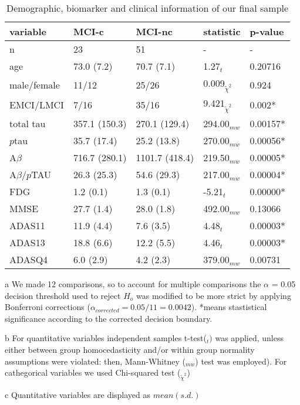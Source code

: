 \documentclass[a4paper,12pt]{elsarticle}
\begin{document}
	
 		\begin{table}[]
 			\centering
 			\begin{threeparttable}
 				\caption{Demographic, biomarker and clinical information of our final sample}
 				\label{my-label}
 				\begin{tabular}{lllll}
 					\toprule
 					variable & MCI-c & MCI-nc & statistic\tnote{b} & p-value \\
 					\midrule
 					n & 23 & 51 & - & -\\
 					age&73.0 (7.2)&70.7 (7.1)&1.27$_{t}$ &0.20716\\
 					male/female& 11/12&25/26&0.009$_{\tilde{\chi}^2}$&0.924\\
 					EMCI/LMCI & 7/16 & 35/16  &  9.421$_{\tilde{\chi}^2}$& 0.002*\\
 					total tau&357.1 (150.3)&270.1 (129.4)&294.00$_{mw}$ &  0.00157*\\
 					$p$tau&35.7 (17.4)&25.2 (13.8)&270.00$_{mw}$ &  0.00056*\\
 					A$\beta$&716.7 (280.1)&1101.7 (418.4)&219.50$_{mw}$ &  0.00005*\\
 					A$\beta/p$TAU&26.3 (25.3)&54.6 (29.3)&217.00$_{mw}$ &  0.00004*\\
 					FDG&1.2 (0.1)&1.3 (0.1)&-5.21$_{t}$&0.00000*\\
 					MMSE&27.7 (1.4)&28.0 (1.8)&492.00$_{mw}$&0.13066\\
 					ADAS11&11.9 (4.4)&7.6 (3.5)&4.48$_{t}$ &0.00003*\\
 					ADAS13&18.8 (6.6)&12.2 (5.5)&4.46$_{t}$ &0.00003*\\
 					ADASQ4& 6.0 (2.9)&4.2 (2.3)&379.00$_{mw}$ &0.00731\\
 					\bottomrule
 				\end{tabular}

	 				\begin{tablenotes}
	 					\item[a]{ We made 12 comparisons, so to account for multiple comparisons the $\alpha$ = 0.05 decision threshold used to reject $H_{o}$ was modified to be more strict by applying Bonferroni corrections ($\alpha_{corrected} = 0.05/11 = 0.0042$). *means stastistical significance according to the corrected decision boundary.}
	 					\item[b]{For quantitative variables independent samples t-test($_{t})$ was applied, unless either between group homocedasticity and/or within group normality assumptions were violated: then, Mann-Whitney ($_{mw}$) test was employed). For cathegorical variables we used Chi-squared test ($_{\tilde{\chi}^2}$})
	 					\item[c]{Quantitative variables are displayed as $mean (s.d.)$}
	 				\end{tablenotes}
 			\end{threeparttable}
 		\end{table}
 		
 		
 		

 
\end{document}
